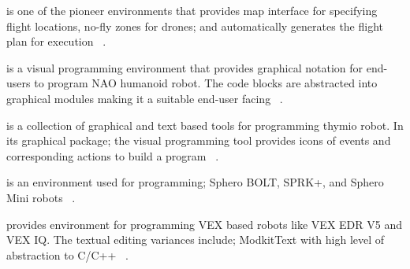 \parhead{\flyaq} is one of the pioneer environments that provides map interface for specifying flight locations, no-fly zones for drones; and automatically generates the flight plan for execution ~\cite{FLYAQ,DiRuscio2014,Bozhinoski2016}.%

\parhead{\tivipe} is a visual programming environment that provides graphical notation for end-users to program NAO humanoid robot. The code blocks are abstracted into graphical modules making it a suitable end-user facing ~\cite{TiViPE}.  %

\parhead{\aseba} is a collection of graphical and text based tools for programming thymio robot. In its graphical package; the visual programming tool provides icons of events and corresponding actions to build a program ~\cite{ASEBA,Magnenat2011}. %

\parhead{\sphero} is an environment used for programming; Sphero BOLT, SPRK+, and Sphero Mini robots ~\cite{Sphero}. %

\parhead{\vex} provides environment for programming VEX based robots like VEX EDR V5 and VEX IQ. 
The textual editing variances include; ModkitText with high level of abstraction to C/C++
~\cite{VexCodingStudio}. %

